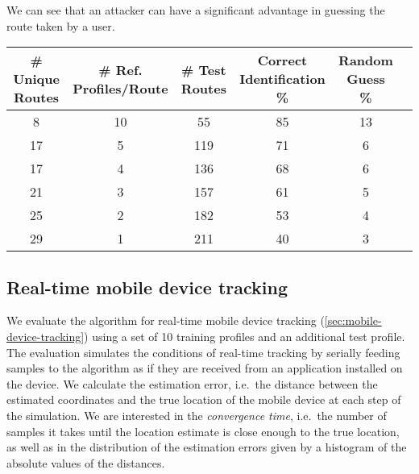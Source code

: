 We can see that an attacker can have a significant advantage in guessing the route taken
by a user.

\begin{table*}
    \centering
    \begin{tabular}{cccccc}
     {\bf \# Unique Routes} &  {\bf \# Ref. Profiles/Route} &  {\bf \# Test Routes} &
     {\bf Correct Identification \%} &  {\bf Random Guess \%} \\
        \hline
          8 &           10 &          55 &       85 &           13 \\
         17 &            5 &         119 &       71 &            6 \\
         17 &            4 &         136 &       68 &            6 \\
         21 &            3 &         157 &       61 &            5 \\
         25 &            2 &         182 &       53 &            4 \\
         29 &            1 &         211 &       40 &            3 \\
    \end{tabular}
    \caption{Route distinguishability evaluation results. First column indicates the number of
    unique routes in the training set. Second column indicates the number of training samples per route
    at the attacker's disposal. Number of test routes indicates the number of power profiles
    the attacker is trying to classify.
    Correct identification percentage indicates the percentage of correctly identified routes as
    a fraction of the third column (test set size),
    which could be then compared to the expected success of random guessing in
    the last column.}
    \label{tab:route-distinguishability-eval}
\end{table*}



\subsection{Real-time mobile device tracking}
We evaluate the algorithm for real-time mobile device tracking (\cref{sec:mobile-device-tracking})
using a set of 10 training profiles and an additional test profile.
The evaluation simulates the conditions of real-time
tracking by serially feeding samples to the algorithm as if they are received
from an application installed on the device.
We calculate the estimation error, i.e.\ the distance between the estimated coordinates
and the true location of the mobile device at each step of the simulation.
We are interested in the \emph{convergence time}, i.e.\ the number of samples it takes
until the location estimate is close enough to the true location, as well as in the distribution
of the estimation errors given by a histogram of the absolute values of the distances.

